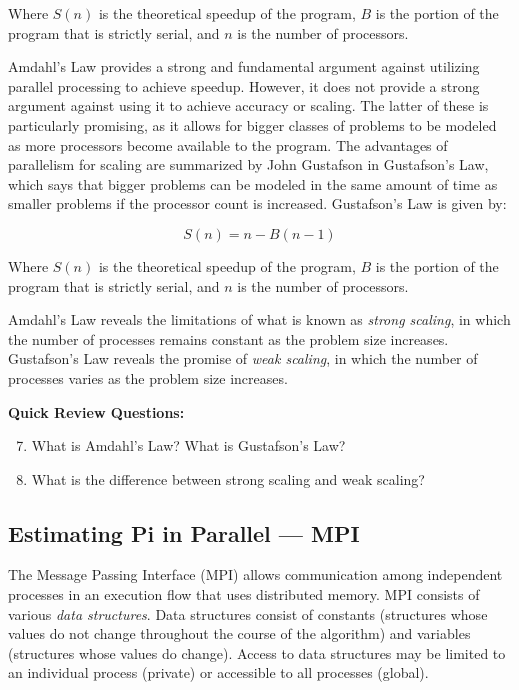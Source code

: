\documentclass[a4paper, 11pt]{article}
\begin{document}
Where $S(n)$ is the theoretical speedup of the program, $B$ is the portion of the program that is strictly serial, and $n$ is the number of processors.

Amdahl's Law provides a strong and fundamental argument against utilizing parallel processing to achieve speedup. However, it does not provide a strong argument against using it to achieve accuracy or scaling. The latter of these is particularly promising, as it allows for bigger classes of problems to be modeled as more processors become available to the program. The advantages of parallelism for scaling are summarized by John Gustafson in Gustafson's Law, which says that bigger problems can be modeled in the same amount of time as smaller problems if the processor count is increased. Gustafson's Law is given by:

\begin{equation}
\label{gustafson}
	S(n) = n - B(n - 1)
\end{equation}

Where $S(n)$ is the theoretical speedup of the program, $B$ is the portion of the program that is strictly serial, and $n$ is the number of processors.

Amdahl's Law reveals the limitations of what is known as \emph{strong scaling}, in which the number of processes remains constant as the problem size increases. Gustafson's Law reveals the promise of \emph{weak scaling}, in which the number of processes varies as the problem size increases.

\bigskip
\textbf{Quick Review Questions:}

\begin{enumerate}
\setcounter{enumi}{6}
\item What is Amdahl's Law? What is Gustafson's Law?
\item What is the difference between strong scaling and weak scaling?
\end{enumerate}


\subsection{Estimating Pi in Parallel --- MPI}

The Message Passing Interface (MPI) allows communication among independent processes in an execution flow that uses distributed memory. MPI consists of various \emph{data structures}. Data structures consist of constants (structures whose values do not change throughout the course of the algorithm) and variables (structures whose values do change). Access to data structures may be limited to an individual process (private) or accessible to all processes (global).
\end{document}
